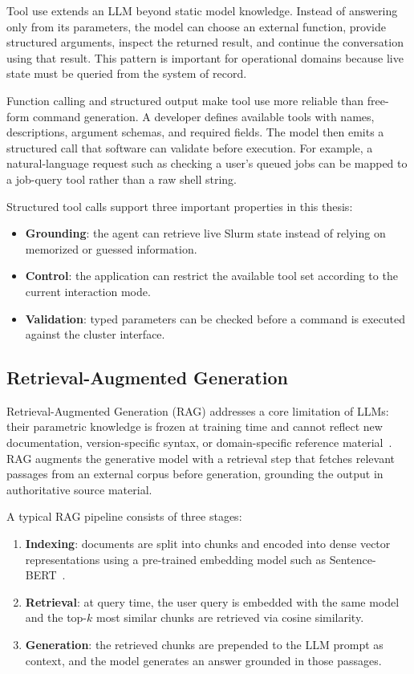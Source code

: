Tool use extends an LLM beyond static model knowledge. Instead of answering only from its parameters, the model can choose an external function, provide structured arguments, inspect the returned result, and continue the conversation using that result. This pattern is important for operational domains because live state must be queried from the system of record.

Function calling and structured output make tool use more reliable than free-form command generation. A developer defines available tools with names, descriptions, argument schemas, and required fields. The model then emits a structured call that software can validate before execution. For example, a natural-language request such as checking a user's queued jobs can be mapped to a job-query tool rather than a raw shell string.

Structured tool calls support three important properties in this thesis:

\begin{itemize}
    \item \textbf{Grounding}: the agent can retrieve live Slurm state instead of relying on memorized or guessed information.
    \item \textbf{Control}: the application can restrict the available tool set according to the current interaction mode.
    \item \textbf{Validation}: typed parameters can be checked before a command is executed against the cluster interface.
\end{itemize}

\subsection{Retrieval-Augmented Generation}
\label{sec:rag-background}

Retrieval-Augmented Generation (RAG) addresses a core limitation of LLMs: their parametric knowledge is frozen at training time and cannot reflect new documentation, version-specific syntax, or domain-specific reference material~\cite{lewis2020retrieval}. RAG augments the generative model with a retrieval step that fetches relevant passages from an external corpus before generation, grounding the output in authoritative source material.

A typical RAG pipeline consists of three stages:
\begin{enumerate}
    \item \textbf{Indexing}: documents are split into chunks and encoded into dense vector representations using a pre-trained embedding model such as Sentence-BERT~\cite{reimers2019sentence}.
    \item \textbf{Retrieval}: at query time, the user query is embedded with the same model and the top-$k$ most similar chunks are retrieved via cosine similarity.
    \item \textbf{Generation}: the retrieved chunks are prepended to the LLM prompt as context, and the model generates an answer grounded in those passages.
\end{enumerate}

